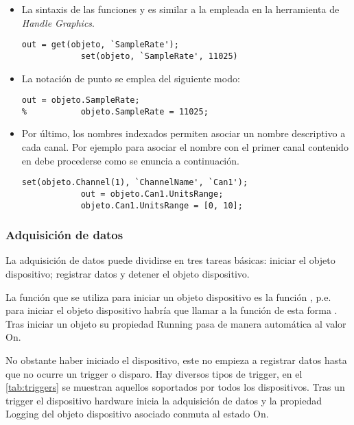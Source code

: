 \begin{itemize}
	\item La sintaxis de las funciones  y  es similar a la empleada en la herramienta de \matlab{} \emph{Handle Graphics}.
		\begin{lstlisting}[gobble=16]
			out = get(objeto, `SampleRate');
			set(objeto, `SampleRate', 11025)
		\end{lstlisting}
	\item La notación de punto se emplea del siguiente modo:
		\begin{lstlisting}[gobble=16]
			out = objeto.SampleRate;
% 			objeto.SampleRate = 11025;
		\end{lstlisting}
	\item Por último, los nombres indexados permiten asociar un nombre descriptivo a cada canal. Por ejemplo para asociar el nombre  con el primer canal contenido en  debe procederse como se enuncia a continuación.
		\begin{lstlisting}[gobble=16]
			set(objeto.Channel(1), `ChannelName', `Can1');
			out = objeto.Can1.UnitsRange;
			objeto.Can1.UnitsRange = [0, 10];
		\end{lstlisting}
\end{itemize}


\subsubsection{Adquisición de datos}

La adquisición de datos puede dividirse en tres tareas básicas: iniciar el objeto dispositivo; registrar datos y detener el objeto dispositivo.\par
La función que se utiliza para iniciar un objeto dispositivo es la función , p.e. para iniciar el objeto dispositivo  habría que llamar a la función de esta forma . Tras iniciar un objeto su propiedad \textsf{Running} pasa de manera automática al valor \textsf{On}.\par
No obstante haber iniciado el dispositivo, este no empieza a registrar datos hasta que no ocurre un trigger o disparo. Hay diversos tipos de trigger, en el \vref{tab:triggers} se muestran aquellos soportados por todos los dispositivos. Tras un trigger el dispositivo hardware inicia la adquisición de datos y la propiedad \textsf{Logging} del objeto dispositivo asociado conmuta al estado \textsf{On}.

